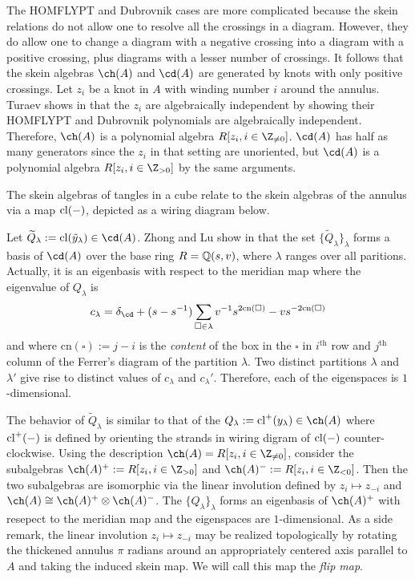 The HOMFLYPT and Dubrovnik cases are more complicated because the skein relations do not allow one to resolve all the crossings in a diagram. However, they do allow one to change a diagram with a negative crossing into a diagram with a positive crossing, plus diagrams with a lesser number of crossings. It follows that the skein algebras $\ch(A)$ and $\cd(A)$ are generated by knots with only positive crossings. Let $z_i$ be a knot in $A$ with winding number $i$ around the annulus. Turaev shows in  that the $z_i$ are algebraically independent by showing their HOMFLYPT and Dubrovnik polynomials are algebraically independent. Therefore, $\ch(A)$ is a polynomial algebra $R[z_i, i \in \Z_{\neq 0}]$. $\cd(A)$ has half as many generators since the $z_i$ in that setting are unoriented, but $\cd(A)$ is a polynomial algebra $R[z_i, i \in \Z_{> 0}]$ by the same arguments. 


The skein algebras of tangles in a cube relate to the skein algebras of the annulus via a map $\mathrm{cl}(-)$, depicted as a wiring diagram below. 


Let $\widetilde{Q}_\lambda := \cl(\tilde{y}_\lambda) \in \cd(A)$. Zhong and Lu show in  that the set $\{ \widetilde{Q}_\lambda \}_\lambda$ forms a basis of $\cd(A)$ over the base ring $R=\mathbb{Q}(s, v)$, where $\lambda$ ranges over all paritions. Actually, it is an eigenbasis with respect to the meridian map
where the eigenvalue of $Q_\lambda$ is 
\[
c_\lambda = \delta_\cd + ( s - s^{-1} ) \sum_{\square \in \lambda} v^{-1} s^{2 \textrm{cn}(\square)} - v s^{-2 \textrm{cn}(\square)}
\]
and where $\textrm{cn}(\square) := j - i$ is the \textit{content} of the box in the $\square$ in $i^\textrm{th}$ row and $j^\textrm{th}$ column of the Ferrer's diagram of the partition $\lambda$. Two distinct partitions $\lambda$ and $\lambda '$ give rise to distinct values of $c_\lambda$ and $c_\lambda'$. Therefore, each of the eigenspaces is $1$-dimensional. 

The behavior of $\widetilde{Q}_\lambda$ is similar to that of the $Q_\lambda := \cl^+(y_\lambda) \in \ch(A)$ where $\mathrm{cl}^+(-)$ is defined by orienting the strands in wiring digram of $\mathrm{cl}(-)$ counter-clockwise. Using the description $\ch(A) = R[z_i, i \in \Z_{\neq 0}]$, consider the subalgebras $\ch(A)^+ := R[z_i, i \in \Z_{> 0}]$ and $\ch(A)^- := R[z_i, i \in \Z_{< 0}]$. Then the two subalgebras are isomorphic via the linear involution defined by $z_i \mapsto z_{-i}$ and $\ch(A) \cong \ch(A)^+ \otimes \ch(A)^-$. The $\{ Q_\lambda \}_\lambda$ forms an eigenbasis of $\ch(A)^+$ with resepect to the meridian map and the eigenspaces are $1$-dimensional. As a side remark, the linear involution $z_i \mapsto z_{-i}$ may be realized topologically by rotating the thickened annulus $\pi$ radians around an appropriately centered axis parallel to $A$ and taking the induced skein map. We will call this map the \textit{flip map}.

